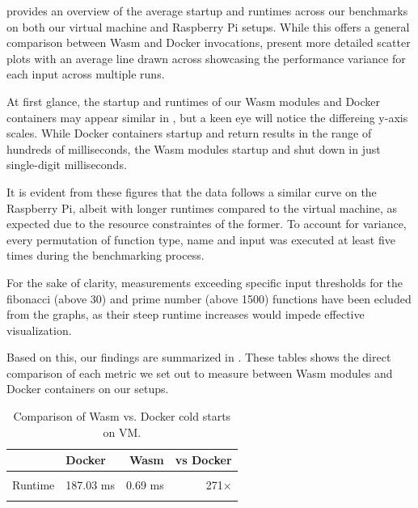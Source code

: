 \documentclass[
  table]{report}
\begin{document}
 provides an overview of the average
startup and runtimes across our benchmarks on both our virtual machine
and Raspberry Pi setups. While this offers a general comparison between
\ac{Wasm} and Docker invocations,
 present more detailed
scatter plots with an average line drawn across showcasing the
performance variance for each input across multiple runs.

At first glance, the startup and runtimes of our \ac{Wasm} modules and
Docker containers may appear similar in
, but a keen eye will notice the
differeing y-axis scales. While Docker containers startup and return
results in the range of hundreds of milliseconds, the \ac{Wasm} modules
startup and shut down in just single-digit milliseconds.

It is evident from these figures that the data follows a similar curve
on the Raspberry Pi, albeit with longer runtimes compared to the virtual
machine, as expected due to the resource constraintes of the former. To
account for variance, every permutation of function type, name and input
was executed at least five times during the benchmarking process.

For the sake of clarity, measurements exceeding specific input
thresholds for the fibonacci (above 30) and prime number (above 1500)
functions have been ecluded from the graphs, as their steep runtime
increases would impede effective visualization.

Based on this, our findings are summarized in
. These tables shows the direct
comparison of each metric we set out to measure between \ac{Wasm}
modules and Docker containers on our setups.

\newpage

\begin{table}[H]
\centering
\caption{\label{tab:nrec_data_table}Comparison of Wasm vs. Docker cold starts on VM.\label{tab:nrec-avg}}
\centering
\begin{tabular}[t]{llrr}
\toprule
  & Docker & Wasm & vs Docker\\
\midrule
\cellcolor{gray!10}{Cold start} & \cellcolor{gray!10}{324.66 ms} & \cellcolor{gray!10}{0.89 ms} & \cellcolor{gray!10}{365×}\\
Runtime & 187.03 ms & 0.69 ms & 271×\\
\cellcolor{gray!10}{Total runtime} & \cellcolor{gray!10}{511.69 ms} & \cellcolor{gray!10}{1.58 ms} & \cellcolor{gray!10}{324×}\\
\bottomrule
\end{tabular}
\end{table}
\end{document}
